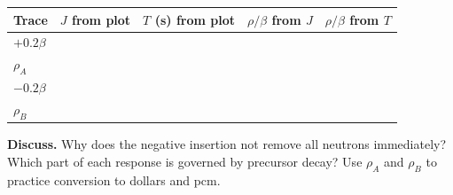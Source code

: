 \documentclass[compact]{ne630handout}
\begin{document}
\begin{center}
\renewcommand{\arraystretch}{1.65}
\begin{tabularx}{.98\linewidth}{@{}lYYYY@{}}
\toprule
\textbf{Trace} & \textbf{$J$ from plot} & \textbf{$T$ (s) from plot} &
\textbf{$\rho/\beta$ from $J$} & \textbf{$\rho/\beta$ from $T$}\\
\midrule
$+0.2\beta$ &  &  &
  & \\
$\rho_A$ &  &
  &  &
 \\
$-0.2\beta$ &  &  &
  & \\
$\rho_B$ &  &  &
  & \\
\bottomrule
\end{tabularx}
\end{center}
\textbf{Discuss.} Why does the negative insertion not remove all neutrons
immediately? Which part of each response is governed by precursor decay?
Use $\rho_A$ and $\rho_B$ to practice conversion to dollars and pcm.
\end{document}
